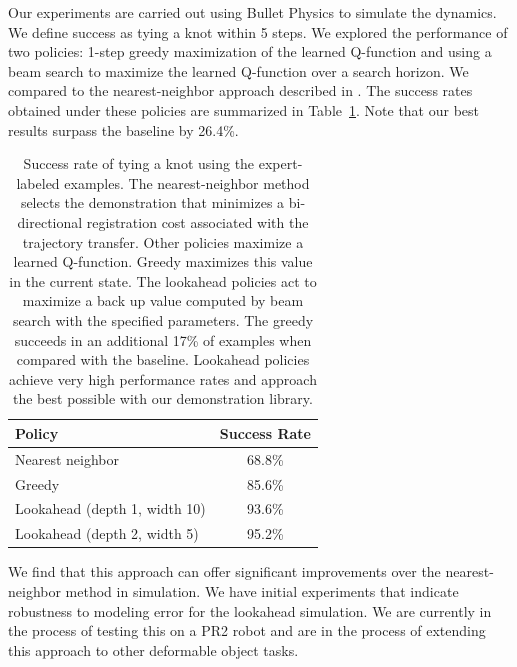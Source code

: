 \documentclass[conference]{IEEEtran}
\begin{document}
Our experiments are carried out using Bullet Physics to simulate the
dynamics. We define success as tying a knot within 5 steps. We
explored the performance of two policies: 1-step greedy maximization
of the learned Q-function and using a beam search to maximize the
learned Q-function over a search horizon. We compared to the nearest-neighbor
approach described in \citet{Schulmanetal_ISRR2013}.  The
success rates obtained under these policies are summarized in
Table~\ref{table:performance}. Note that our best results surpass the
baseline by 26.4\%.
\begin{table}
  \centering
  \normalsize
  \begin{tabular}{lc}
    \toprule
      Policy & Success Rate\\
    \midrule
      Nearest neighbor \cite{Schulmanetal_ISRR2013} & 68.8\% \\
    \midrule
      Greedy & 85.6\% \\
      Lookahead (depth 1, width 10) & 93.6\% \\
      Lookahead (depth 2, width 5) & 95.2\% \\
    \bottomrule
  \end{tabular}
  \caption{Success rate of tying a knot using the expert-labeled
    examples. The nearest-neighbor method selects the demonstration
    that minimizes a bi-directional registration cost associated with
    the trajectory transfer.  Other policies maximize a learned
    Q-function. Greedy maximizes this value in the current state. The
    lookahead policies act to maximize a back up value computed by
    beam search with the specified parameters. The greedy succeeds in
    an additional 17\% of examples when compared with the
    baseline. Lookahead policies achieve very high performance rates
    and approach the best possible with our demonstration library.}
  \label{table:performance}
\end{table}

We find that this approach can offer significant improvements over the
nearest-neighbor method in simulation. We have initial experiments
that indicate robustness to modeling error for the lookahead
simulation. We are currently in the process of testing this on a
PR2 robot and are in the process of extending this approach to other deformable
object tasks. 

\maketitle



\footnotesize

\end{document}
